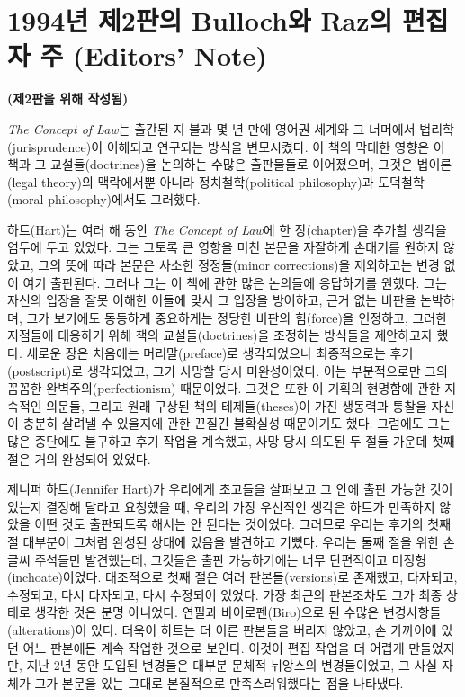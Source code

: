 \section{1994년 제2판의 Bulloch와 Raz의 편집자 주 (Editors'
Note)}\label{uxb144-uxc81c2uxd310uxc758-bullochuxc640-razuxc758-uxd3b8uxc9d1uxc790-uxc8fc-editors-note}

\textbf{(제2판을 위해 작성됨)}

{\small

\emph{The Concept of Law}는 출간된 지 불과 몇 년 만에 영어권 세계와 그
너머에서 법리학(jurisprudence)이 이해되고 연구되는 방식을 변모시켰다. 이
책의 막대한 영향은 이 책과 그 교설들(doctrines)을 논의하는 수많은
출판물들로 이어졌으며, 그것은 법이론(legal theory)의 맥락에서뿐 아니라
정치철학(political philosophy)과 도덕철학(moral philosophy)에서도
그러했다.

하트(Hart)는 여러 해 동안 \emph{The Concept of Law}에 한 장(chapter)을
추가할 생각을 염두에 두고 있었다. 그는 그토록 큰 영향을 미친 본문을
자잘하게 손대기를 원하지 않았고, 그의 뜻에 따라 본문은 사소한
정정들(minor corrections)을 제외하고는 변경 없이 여기 출판된다. 그러나
그는 이 책에 관한 많은 논의들에 응답하기를 원했다. 그는 자신의 입장을
잘못 이해한 이들에 맞서 그 입장을 방어하고, 근거 없는 비판을 논박하며,
그가 보기에도 동등하게 중요하게는 정당한 비판의 힘(force)을 인정하고,
그러한 지점들에 대응하기 위해 책의 교설들(doctrines)을 조정하는 방식들을
제안하고자 했다. 새로운 장은 처음에는 머리말(preface)로 생각되었으나
최종적으로는 후기(postscript)로 생각되었고, 그가 사망할 당시
미완성이었다. 이는 부분적으로만 그의 꼼꼼한 완벽주의(perfectionism)
때문이었다. 그것은 또한 이 기획의 현명함에 관한 지속적인 의문들, 그리고
원래 구상된 책의 테제들(theses)이 가진 생동력과 통찰을 자신이 충분히
살려낼 수 있을지에 관한 끈질긴 불확실성 때문이기도 했다. 그럼에도 그는
많은 중단에도 불구하고 후기 작업을 계속했고, 사망 당시 의도된 두 절들
가운데 첫째 절은 거의 완성되어 있었다.

제니퍼 하트(Jennifer Hart)가 우리에게 초고들을 살펴보고 그 안에 출판
가능한 것이 있는지 결정해 달라고 요청했을 때, 우리의 가장 우선적인
생각은 하트가 만족하지 않았을 어떤 것도 출판되도록 해서는 안 된다는
것이었다. 그러므로 우리는 후기의 첫째 절 대부분이 그처럼 완성된 상태에
있음을 발견하고 기뻤다. 우리는 둘째 절을 위한 손글씨 주석들만
발견했는데, 그것들은 출판 가능하기에는 너무 단편적이고
미정형(inchoate)이었다. 대조적으로 첫째 절은 여러 판본들(versions)로
존재했고, 타자되고, 수정되고, 다시 타자되고, 다시 수정되어 있었다. 가장
최근의 판본조차도 그가 최종 상태로 생각한 것은 분명 아니었다. 연필과
바이로펜(Biro)으로 된 수많은 변경사항들(alterations)이 있다. 더욱이
하트는 더 이른 판본들을 버리지 않았고, 손 가까이에 있던 어느 판본에든
계속 작업한 것으로 보인다. 이것이 편집 작업을 더 어렵게 만들었지만, 지난
2년 동안 도입된 변경들은 대부분 문체적 뉘앙스의 변경들이었고, 그 사실
자체가 그가 본문을 있는 그대로 본질적으로 만족스러워했다는 점을
나타냈다.

}
